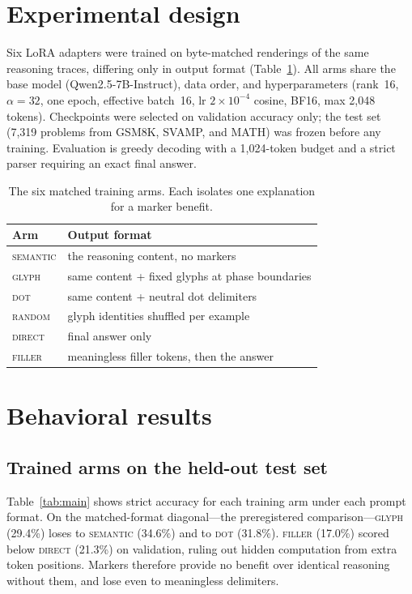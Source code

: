 \documentclass[11pt]{article}
\newcommand{\arm}[1]{\textsc{#1}}
\begin{document}
\section{Experimental design}

Six LoRA adapters were trained on byte-matched renderings of the same reasoning traces, differing only in output format (Table~\ref{tab:arms}).
All arms share the base model (Qwen2.5-7B-Instruct), data order, and hyperparameters (rank~16, $\alpha=32$, one epoch, effective batch~16, lr $2\times10^{-4}$ cosine, BF16, max 2{,}048 tokens).
Checkpoints were selected on validation accuracy only; the test set (7{,}319 problems from GSM8K, SVAMP, and MATH) was frozen before any training.
Evaluation is greedy decoding with a 1{,}024-token budget and a strict parser requiring an exact final answer.

\begin{table}[h]\centering\small
\begin{tabular}{ll}
\toprule
Arm & Output format \\
\midrule
\arm{semantic} & the reasoning content, no markers \\
\arm{glyph}    & same content + fixed glyphs at phase boundaries \\
\arm{dot}      & same content + neutral dot delimiters \\
\arm{random}   & glyph identities shuffled per example \\
\arm{direct}   & final answer only \\
\arm{filler}   & meaningless filler tokens, then the answer \\
\bottomrule
\end{tabular}
\caption{The six matched training arms. Each isolates one explanation for a marker benefit.}
\label{tab:arms}
\end{table}

\section{Behavioral results}

\subsection{Trained arms on the held-out test set}

Table~\ref{tab:main} shows strict accuracy for each training arm under each prompt format.
On the matched-format diagonal---the preregistered comparison---\arm{glyph} (29.4\%) loses to \arm{semantic} (34.6\%) and to \arm{dot} (31.8\%).
\arm{filler} (17.0\%) scored below \arm{direct} (21.3\%) on validation, ruling out hidden computation from extra token positions.
Markers therefore provide no benefit over identical reasoning without them, and lose even to meaningless delimiters.
\end{document}
